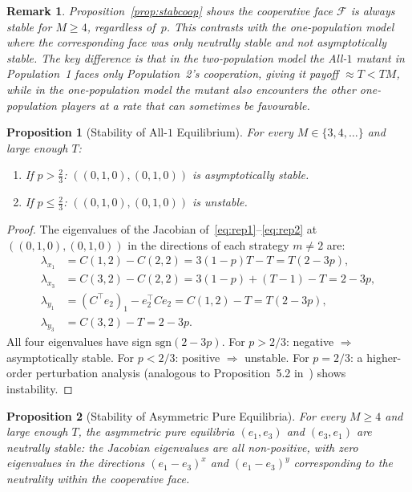 \documentclass[12pt,a4paper]{article}
\newtheorem{proposition}{Proposition}[section]
\newtheorem{remark}{Remark}[section]
\begin{document}
\begin{remark}
Proposition~\ref{prop:stabcoop} shows the cooperative face $\mathcal{F}$ is
\emph{always} stable for $M\geq 4$, regardless of~$p$.  This contrasts with
the one-population model where the corresponding face was only neutrally stable
and not asymptotically stable.  The key difference is that in the two-population
model the All-$1$ mutant in Population~1 faces only Population~2's cooperation,
giving it payoff $\approx T < TM$, while in the one-population model the
mutant also encounters the other one-population players at a rate that can
sometimes be favourable.
\end{remark}

\begin{proposition}[Stability of All-$1$ Equilibrium]\label{prop:stabA1}
For every $M\in\{3,4,\ldots\}$ and large enough $T$:
\begin{enumerate}
  \item If $p>\tfrac{2}{3}$: $((0,1,0),(0,1,0))$ is asymptotically stable.
  \item If $p\leq\tfrac{2}{3}$: $((0,1,0),(0,1,0))$ is unstable.
\end{enumerate}
\end{proposition}

\begin{proof}
The eigenvalues of the Jacobian of~\eqref{eq:rep1}--\eqref{eq:rep2} at
$((0,1,0),(0,1,0))$ in the directions of each strategy $m\neq 2$ are:
\begin{align*}
  \lambda_{x_1} &= C(1,2)-C(2,2) = 3(1-p)T-T = T(2-3p),\\
  \lambda_{x_3} &= C(3,2)-C(2,2) = 3(1-p)+(T-1)-T = 2-3p,\\
  \lambda_{y_1} &= (C^\top e_2)_1 - e_2^\top Ce_2 = C(1,2)-T = T(2-3p),\\
  \lambda_{y_3} &= C(3,2)-T = 2-3p.
\end{align*}
All four eigenvalues have sign $\text{sgn}(2-3p)$.  For $p>2/3$: negative
$\Rightarrow$ asymptotically stable.  For $p<2/3$: positive $\Rightarrow$
unstable.  For $p=2/3$: a higher-order perturbation analysis (analogous to
Proposition~5.2 in~\cite{LK2026}) shows instability.
\end{proof}

\begin{proposition}[Stability of Asymmetric Pure Equilibria]\label{prop:stabAsym}
For every $M\geq 4$ and large enough $T$, the asymmetric pure equilibria
$(e_1,e_3)$ and $(e_3,e_1)$ are \emph{neutrally stable}: the Jacobian
eigenvalues are all non-positive, with zero eigenvalues in the directions
$(e_1-e_3)^x$ and $(e_1-e_3)^y$ corresponding to the neutrality within the
cooperative face.
\end{proposition}
\end{document}
